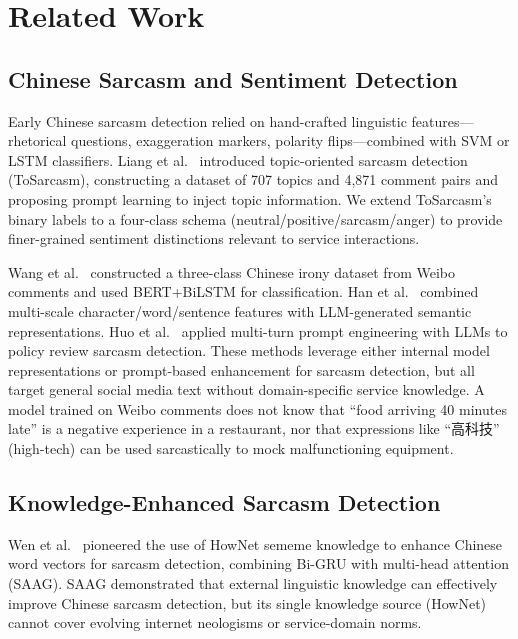 \documentclass[conference]{IEEEtran}
\begin{document}
\section{Related Work}

\subsection{Chinese Sarcasm and Sentiment Detection}

Early Chinese sarcasm detection relied on hand-crafted linguistic features—
rhetorical questions, exaggeration markers, polarity flips—combined with SVM or
LSTM classifiers. Liang et al.~\cite{tosarcasm2023} introduced topic-oriented
sarcasm detection (ToSarcasm), constructing a dataset of 707 topics and 4,871
comment pairs and proposing prompt learning to inject topic information.
We extend ToSarcasm's binary labels to a four-class schema
(neutral/positive/sarcasm/anger) to provide finer-grained sentiment distinctions
relevant to service interactions.

Wang et al.~\cite{bertbilstm2024} constructed a three-class Chinese irony dataset
from Weibo comments and used BERT+BiLSTM for classification.
Han et al.~\cite{multiscale2025} combined multi-scale character/word/sentence
features with LLM-generated semantic representations.
Huo et al.~\cite{policy2024} applied multi-turn prompt engineering with LLMs to
policy review sarcasm detection.
These methods leverage either internal model representations or prompt-based
enhancement for sarcasm detection, but all target general social media text
without domain-specific service knowledge.
A model trained on Weibo comments does not know that ``food arriving 40 minutes
late'' is a negative experience in a restaurant, nor that expressions like
``高科技'' (high-tech) can be used sarcastically to mock malfunctioning equipment.

\subsection{Knowledge-Enhanced Sarcasm Detection}

Wen et al.~\cite{saag2022} pioneered the use of HowNet sememe knowledge to
enhance Chinese word vectors for sarcasm detection, combining Bi-GRU with
multi-head attention (SAAG). SAAG demonstrated that external linguistic knowledge
can effectively improve Chinese sarcasm detection, but its single knowledge source
(HowNet) cannot cover evolving internet neologisms or service-domain norms.
\end{document}
